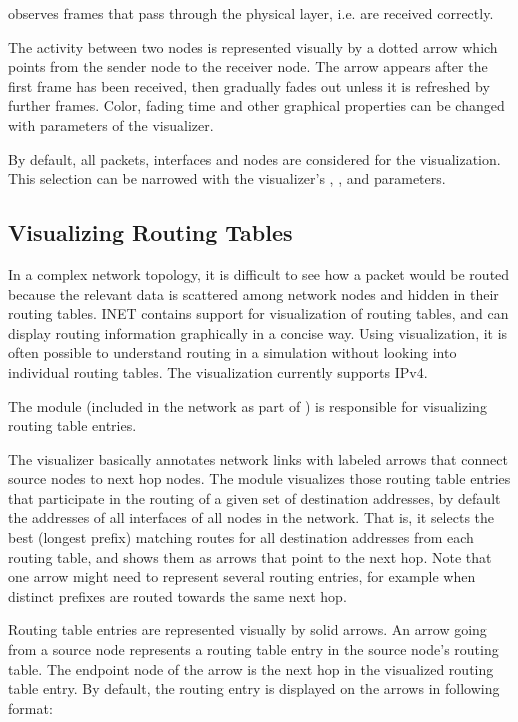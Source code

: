  observes frames that pass through the physical layer,
i.e. are received correctly.

The activity between two nodes is represented visually by a dotted arrow which
points from the sender node to the receiver node. The arrow appears after the
first frame has been received, then gradually fades out unless it is refreshed
by further frames. Color, fading time and other graphical properties can be
changed with parameters of the visualizer.

By default, all packets, interfaces and nodes are considered for the
visualization. This selection can be narrowed with the visualizer's
, , and  parameters.


\subsection{Visualizing Routing Tables}
\label{sec:visualization:routing-tables}

In a complex network topology, it is difficult to see how a packet would be
routed because the relevant data is scattered among network nodes and hidden in
their routing tables. INET contains support for visualization of routing tables,
and can display routing information graphically in a concise way. Using
visualization, it is often possible to understand routing in a simulation
without looking into individual routing tables. The visualization currently
supports IPv4.

The  module (included in the network as part of
) is responsible for visualizing routing table entries.

The visualizer basically annotates network links with labeled arrows that
connect source nodes to next hop nodes. The module visualizes those routing
table entries that participate in the routing of a given set of destination
addresses, by default the addresses of all interfaces of all nodes in the
network. That is, it selects the best (longest prefix) matching routes for all
destination addresses from each routing table, and shows them as arrows that
point to the next hop. Note that one arrow might need to represent several
routing entries, for example when distinct prefixes are routed towards the same
next hop.

Routing table entries are represented visually by solid arrows. An arrow going
from a source node represents a routing table entry in the source node's routing
table. The endpoint node of the arrow is the next hop in the visualized routing
table entry. By default, the routing entry is displayed on the arrows in
following format:

